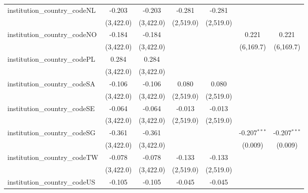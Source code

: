 \begin{tabular}{lcccccc}
   institution\_country\_codeNL          & -0.203         & -0.203         & -0.281        & -0.281        &                &   \\   
                                         & (3,422.0)      & (3,422.0)      & (2,519.0)     & (2,519.0)     &                &   \\   
   institution\_country\_codeNO          & -0.184         & -0.184         &               &               & 0.221          & 0.221\\   
                                         & (3,422.0)      & (3,422.0)      &               &               & (6,169.7)      & (6,169.7)\\   
   institution\_country\_codePL          & 0.284          & 0.284          &               &               &                &   \\   
                                         & (3,422.0)      & (3,422.0)      &               &               &                &   \\   
   institution\_country\_codeSA          & -0.106         & -0.106         & 0.080         & 0.080         &                &   \\   
                                         & (3,422.0)      & (3,422.0)      & (2,519.0)     & (2,519.0)     &                &   \\   
   institution\_country\_codeSE          & -0.064         & -0.064         & -0.013        & -0.013        &                &   \\   
                                         & (3,422.0)      & (3,422.0)      & (2,519.0)     & (2,519.0)     &                &   \\   
   institution\_country\_codeSG          & -0.361         & -0.361         &               &               & -0.207$^{***}$ & -0.207$^{***}$\\   
                                         & (3,422.0)      & (3,422.0)      &               &               & (0.009)        & (0.009)\\   
   institution\_country\_codeTW          & -0.078         & -0.078         & -0.133        & -0.133        &                &   \\   
                                         & (3,422.0)      & (3,422.0)      & (2,519.0)     & (2,519.0)     &                &   \\   
   institution\_country\_codeUS          & -0.105         & -0.105         & -0.045        & -0.045        &                &   \\   

\end{tabular}
